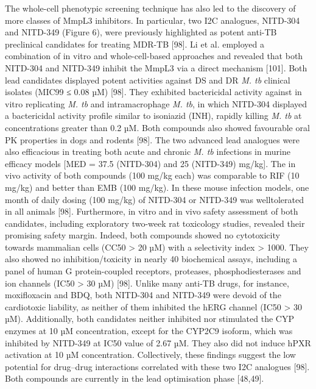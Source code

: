 \documentclass{article}
\begin{document}
The whole-cell phenotypic screening technique has also led to the discovery of more classes of MmpL3 inhibitors. In particular, two I2C analogues, NITD-304 and NITD-349 (Figure 6), were previously highlighted as potent anti-TB preclinical candidates for treating MDR-TB [98]. Li et al. employed a combination of in vitro and whole-cell-based approaches and revealed that both NITD-304 and NITD-349 inhibit the MmpL3 via a direct mechanism [101]. Both lead candidates displayed potent activities against DS and DR \textit{M. tb} clinical isolates (MIC99 ≤ 0.08 µM) [98]. They exhibited bactericidal activity against in vitro replicating \textit{M. tb} and intramacrophage \textit{M. tb}, in which NITD-304 displayed a bactericidal activity profile similar to isoniazid (INH), rapidly killing \textit{M. tb} at concentrations greater than 0.2 µM. Both compounds also showed favourable oral PK properties in dogs and rodents [98]. The two advanced lead analogues were also efficacious in treating both acute and chronic \textit{M. tb} infections in murine efficacy models [MED = 37.5 (NITD-304) and 25 (NITD-349) mg/kg]. The in vivo activity of both compounds (100 mg/kg each) was comparable to RIF (10 mg/kg) and better than EMB (100 mg/kg). In these mouse infection models, one month of daily dosing (100 mg/kg) of NITD-304 or NITD-349 was welltolerated in all animals [98]. Furthermore, in vitro and in vivo safety assessment of both candidates, including exploratory two-week rat toxicology studies, revealed their promising safety margin. Indeed, both compounds showed no cytotoxicity towards mammalian cells (CC50 > 20 µM) with a selectivity index > 1000. They also showed no inhibition/toxicity in nearly 40 biochemical assays, including a panel of human G protein-coupled receptors, proteases, phosphodiesterases and ion channels (IC50 > 30 µM) [98]. Unlike many anti-TB drugs, for instance, moxifloxacin and BDQ, both NITD-304 and NITD-349 were devoid of the cardiotoxic liability, as neither of them inhibited the hERG channel (IC50 > 30 µM). Additionally, both candidates neither inhibited nor stimulated the CYP enzymes at 10 µM concentration, except for the CYP2C9 isoform, which was inhibited by NITD-349 at IC50 value of 2.67 µM. They also did not induce hPXR activation at 10 µM concentration. Collectively, these findings suggest the low potential for drug–drug interactions correlated with these two I2C analogues [98]. Both compounds are currently in the lead optimisation phase [48,49].
\end{document}

